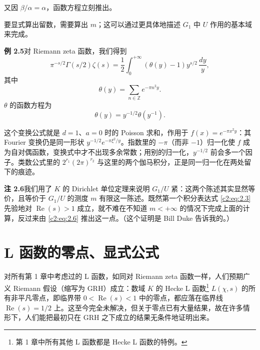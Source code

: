 又因 $\beta/\alpha=\alpha$，函数方程立刻推出。

要显式算出留数，需要算出 $m$；这可以通过更具体地描述 $G_1$ 中 $U$ 作用的基本域来完成。

\par\medskip\noindent\textbf{例 2.5}\quad 对 Riemann zeta 函数，我们得到
\[
\pi^{-s/2}\Gamma(s/2)\zeta(s)=\frac{1}{2}\int_0^{+\infty}(\theta(y)-1)y^{s/2}\,\frac{dy}{y},
\]
其中
\[
\theta(y)=\sum_{n\in\mathbb{Z}}e^{-\pi n^2y}.
\]
$\theta$ 的函数方程为
\[
\theta(y)=y^{-1/2}\theta(y^{-1}).
\]

\begin{annote}
这个变换公式就是 $d=1$、$a=0$ 时的 Poisson 求和，作用于 $f(x)=e^{-\pi x^2y}$：其 Fourier 变换仍是同一形状 $y^{-1/2}e^{-\pi\xi^2/y}$。指数里的 $-\pi$（而非 $-1$）归一化使 $f$ 成为自对偶函数，变换式中才不出现多余常数；用别的归一化，$y^{-1/2}$ 前会多一个因子。类数公式里的 $2^{r_1}(2\pi)^{r_2}$ 与这里的两个伽马积分，正是同一归一化在两处留下的痕迹。
\par\vspace{0.15em}{\raggedleft 【来源：Titchmarsh 前引书第 2 章（A）；Serre《A Course in Arithmetic》Ch.~VII（A）；nLab “Theta function” 条目（B，与 A 交叉）】\par}
\end{annote}

\par\medskip\noindent\textbf{注 2.6}\quad 我们用了 $K$ 的 Dirichlet 单位定理来说明 $G_1/U$ 紧：这两个陈述其实显然等价，且等价于 $G_1/U$ 的测度 $m$ 有限这一陈述。既然第一个积分表达式 \eqref{c2:eq:2.3} 先验地对 $\operatorname{Re}(s)>1$ 成立，就不难在不知道 $m<+\infty$ 的情况下完成上面的计算，反过来由 \eqref{c2:eq:2.6} 推出这一点。（这个证明是 Bill Duke 告诉我的。）

\section{L 函数的零点、显式公式}\label{c2:sec:3}

对所有第 1 章中考虑过的 L 函数，如同对 Riemann zeta 函数一样，人们预期广义 Riemann 假设（缩写为 GRH）成立：数域 $K$ 的 Hecke L 函数\footnote{第 1 章中所有其他 L 函数都是 Hecke L 函数的特例。} $L(\chi,s)$ 的所有非平凡零点，即临界带 $0<\operatorname{Re}(s)<1$ 中的零点，都应落在临界线 $\operatorname{Re}(s)=1/2$ 上。这至今完全未解决，但关于零点已有大量结果，故在许多情形下，人们能把最初只在 GRH 之下成立的结果无条件地证明出来。

